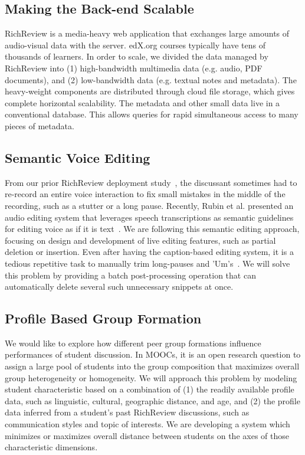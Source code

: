 \documentclass{sigchi}
\begin{document}
\subsection{Making the Back-end Scalable}
RichReview is a media-heavy web application that exchanges large amounts of audio-visual data with the server. edX.org courses typically have tens of thousands of learners.
In order to scale, we divided the data managed by RichReview into (1) high-bandwidth multimedia data (e.g. audio, PDF documents), and (2) low-bandwidth data (e.g. textual notes and metadata).
The heavy-weight components are distributed through cloud file storage, which gives complete horizontal scalability. The metadata and other small data live in a conventional database. This allows queries for rapid simultaneous access to many pieces of metadata.

\subsection{Semantic Voice Editing}
From our prior RichReview deployment study~\cite{yoon2015richreview}, the discussant sometimes had to re-record an entire voice interaction to fix small mistakes in the middle of the recording, such as a stutter or a long pause.
Recently, Rubin et al. presented an audio editing system that leverages speech transcriptions as semantic guidelines for editing voice as if it is text~\cite{rubin2013content}.
We are following this semantic editing approach, focusing on design and development of live editing features, such as partial deletion or insertion.
Even after having the caption-based editing system, it is a tedious repetitive task to manually trim long-pauses and 'Um's~\cite{yoon2014richreview}.
We will solve this problem by providing a batch post-processing operation that can automatically delete several such unnecessary snippets at once.

\subsection{Profile Based Group Formation}
We would like to explore how different peer group formations influence performances of student discussion. 
In MOOCs, it is an open research question to assign a large pool of students into the group composition that maximizes overall group heterogeneity or homogeneity.
We will approach this problem by modeling student characteristic based on a combination of (1) the readily available profile data, such as linguistic, cultural, geographic distance, and age, and (2) the profile data inferred from a student's past RichReview discussions, such as communication styles and topic of interests.
We are developing a system which minimizes or maximizes overall distance between students on the axes of those characteristic dimensions.
\end{document}
